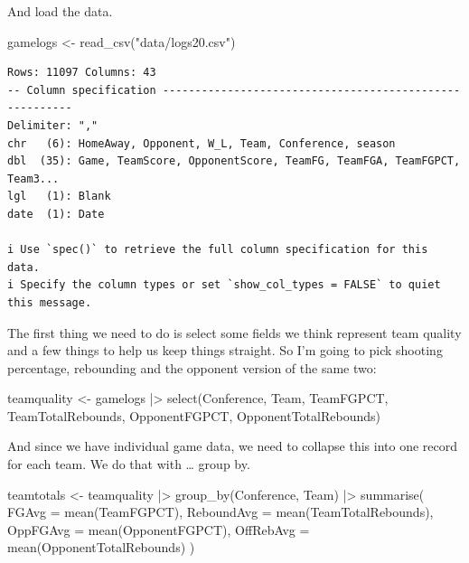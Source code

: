 \documentclass[
  letterpaper,
  DIV=11,
  numbers=noendperiod]{scrreprt}
\newenvironment{Shaded}{\begin{snugshade}}{\end{snugshade}}
\newcommand{\AttributeTok}[1]{\textcolor[rgb]{0.40,0.45,0.13}{#1}}
\newcommand{\FunctionTok}[1]{\textcolor[rgb]{0.28,0.35,0.67}{#1}}
\newcommand{\NormalTok}[1]{\textcolor[rgb]{0.00,0.23,0.31}{#1}}
\newcommand{\OtherTok}[1]{\textcolor[rgb]{0.00,0.23,0.31}{#1}}
\newcommand{\SpecialCharTok}[1]{\textcolor[rgb]{0.37,0.37,0.37}{#1}}
\newcommand{\StringTok}[1]{\textcolor[rgb]{0.13,0.47,0.30}{#1}}
\begin{document}
And load the data.

\begin{Shaded}
\begin{Highlighting}[]
\NormalTok{gamelogs }\OtherTok{\textless{}{-}} \FunctionTok{read\_csv}\NormalTok{(}\StringTok{"data/logs20.csv"}\NormalTok{)}
\end{Highlighting}
\end{Shaded}

\begin{verbatim}
Rows: 11097 Columns: 43
-- Column specification --------------------------------------------------------
Delimiter: ","
chr   (6): HomeAway, Opponent, W_L, Team, Conference, season
dbl  (35): Game, TeamScore, OpponentScore, TeamFG, TeamFGA, TeamFGPCT, Team3...
lgl   (1): Blank
date  (1): Date

i Use `spec()` to retrieve the full column specification for this data.
i Specify the column types or set `show_col_types = FALSE` to quiet this message.
\end{verbatim}

The first thing we need to do is select some fields we think represent
team quality and a few things to help us keep things straight. So I'm
going to pick shooting percentage, rebounding and the opponent version
of the same two:

\begin{Shaded}
\begin{Highlighting}[]
\NormalTok{teamquality }\OtherTok{\textless{}{-}}\NormalTok{ gamelogs }\SpecialCharTok{|\textgreater{}} 
  \FunctionTok{select}\NormalTok{(Conference, Team, TeamFGPCT, TeamTotalRebounds, OpponentFGPCT, OpponentTotalRebounds)}
\end{Highlighting}
\end{Shaded}

And since we have individual game data, we need to collapse this into
one record for each team. We do that with \ldots{} group by.

\begin{Shaded}
\begin{Highlighting}[]
\NormalTok{teamtotals }\OtherTok{\textless{}{-}}\NormalTok{ teamquality }\SpecialCharTok{|\textgreater{}} 
  \FunctionTok{group\_by}\NormalTok{(Conference, Team) }\SpecialCharTok{|\textgreater{}} 
  \FunctionTok{summarise}\NormalTok{(}
    \AttributeTok{FGAvg =} \FunctionTok{mean}\NormalTok{(TeamFGPCT), }
    \AttributeTok{ReboundAvg =} \FunctionTok{mean}\NormalTok{(TeamTotalRebounds), }
    \AttributeTok{OppFGAvg =} \FunctionTok{mean}\NormalTok{(OpponentFGPCT),}
    \AttributeTok{OffRebAvg =} \FunctionTok{mean}\NormalTok{(OpponentTotalRebounds)}
\NormalTok{    ) }
\end{Highlighting}
\end{Shaded}
\end{document}
